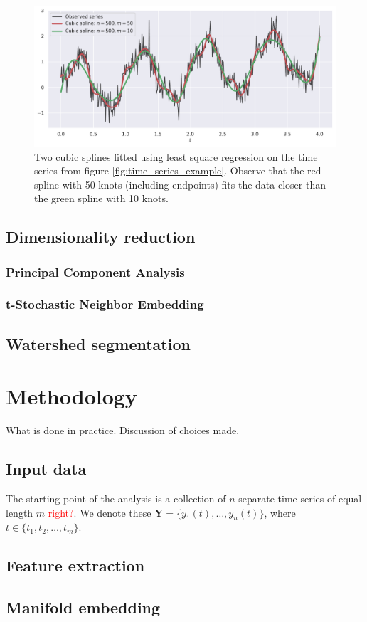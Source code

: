 \documentclass[a4paper]{memoir}
\theoremstyle{plain}
\theoremstyle{definition}
\theoremstyle{remark}
\begin{document}
\begin{figure}[tb ]
        \centering
        \includegraphics[width=\linewidth]{./code/figures/cubic_splines.pdf}
        \caption{Two cubic splines fitted using least square regression on the time series from figure \ref{fig:time_series_example}.
        Observe that the red spline with 50 knots (including endpoints) fits the data closer than the green spline with 10 knots.}
        \label{fig:cubic_splines}
\end{figure}




\section{Dimensionality reduction}
\subsection{Principal Component Analysis}
\subsection{t-Stochastic Neighbor Embedding}

\section{Watershed segmentation}

\chapter{Methodology}
What is done in practice.
Discussion  of choices made.
\section{Input data}
The starting point of the analysis is a collection of $n$ separate time series of equal length $m$ \textcolor{red}{right?}.
We denote these $\textbf{Y} = \{ y_1(t), \hdots, y_n(t) \}$, where $t \in \{ t_1, t_2, \hdots, t_m \}$.
\section{Feature extraction}
\section{Manifold embedding}








\newpage
\printbibliography
\end{document}
